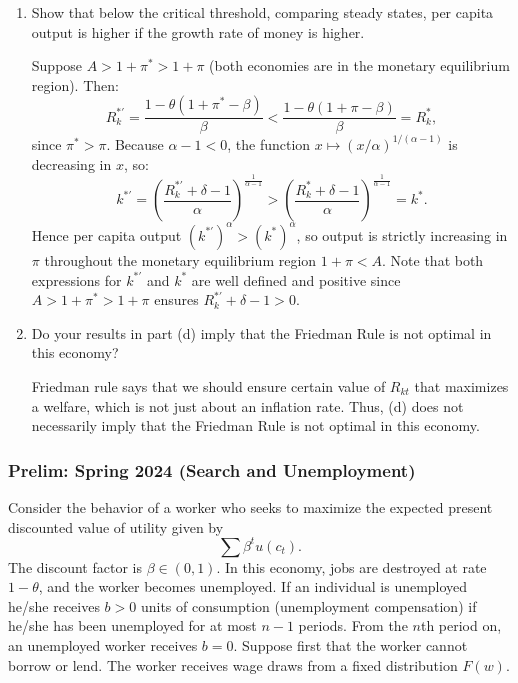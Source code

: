 \documentclass[11pt,english]{article}
\begin{document}
\begin{enumerate}
\item[(d)] Show that below the critical threshold, comparing steady states,
    per capita output is higher if the growth rate of money is higher.
\begin{solution}
Suppose $A > 1+\pi^* > 1+\pi$ (both economies are in the monetary
equilibrium region). Then:
\[
    R_k^{*\prime} = \frac{1-\theta(1+\pi^*-\beta)}{\beta}
    < \frac{1-\theta(1+\pi-\beta)}{\beta} = R_k^*,
\]
since $\pi^* > \pi$. Because $\alpha - 1 < 0$, the function $x \mapsto
(x/\alpha)^{1/(\alpha-1)}$ is decreasing in $x$, so:
\[
    k^{*\prime} = \left(\frac{R_k^{*\prime}+\delta-1}{\alpha}\right)^{\!\frac{1}{\alpha-1}}
    > \left(\frac{R_k^*+\delta-1}{\alpha}\right)^{\!\frac{1}{\alpha-1}} = k^*.
\]
Hence per capita output $(k^{*\prime})^\alpha > (k^*)^\alpha$, so output is
strictly increasing in $\pi$ throughout the monetary equilibrium region $1+\pi
< A$. Note that both expressions for $k^{*\prime}$ and $k^*$ are well defined
and positive since $A > 1+\pi^* > 1+\pi$ ensures $R_k^{*\prime}+\delta-1 > 0$.
\end{solution}
 
    \item[(e)] Do your results in part (d) imply that the Friedman Rule is not
        optimal in this economy?
    \begin{solution}
 Friedman rule says that we should ensure certain value of $R_{kt}$ that maximizes a welfare, which is not just about an inflation rate. Thus, (d) does not necessarily imply that the Friedman Rule is not optimal in this economy.
    \end{solution}
\end{enumerate}
 
\subsubsection{Prelim: Spring 2024 (Search and Unemployment)}
Consider the behavior of a worker who seeks to maximize the expected present
discounted value of utility given by
\[
    \sum \beta^t u(c_t).
\]
The discount factor is $\beta \in (0,1)$. In this economy, jobs are destroyed
at rate $1 - \theta$, and the worker becomes unemployed. If an individual is
unemployed he/she receives $b > 0$ units of consumption (unemployment
compensation) if he/she has been unemployed for at most $n - 1$ periods. From
the $n$th period on, an unemployed worker receives $b = 0$. Suppose first that
the worker cannot borrow or lend. The worker receives wage draws from a fixed
distribution $F(w)$.
 
\end{document}
